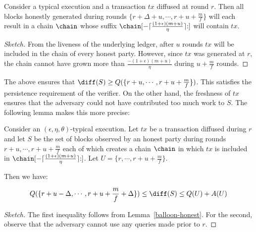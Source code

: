 \begin{lemma}\label{lem:balloon-honest}
Consider a typical execution and a transaction $tx$ diffused at round $r$. Then
all blocks honestly generated during rounds $\{r + \Delta + u, \cdots, r + u + \frac{m}{f}\}$
will each result in a chain $\chain$ whose suffix $\chain[-\lceil\frac{(1 +
\epsilon)(m + u)}{\eta}\rceil{:}]$ will contain $tx$.
\end{lemma}
\begin{proof}[Sketch]
  From the liveness of the underlying ledger, after $u$ rounds $tx$ will be
  included in the chain of every honest party. However, since $tx$ was generated
  at $r$, the chain cannot have grown more than
  $\frac{-(1 + \epsilon)(m + u)}{\eta}$ during $u + \frac{m}{f}$ rounds.
\end{proof}

The above ensures that
$\diff(S) \geq Q(\{r + u, \cdots, r + u + \frac{m}{f}\})$. This satisfies the
persistence requirement of the verifier. On the other hand, the freshness of
$tx$ ensures that the adversary could not have contributed too much work to
$S$. The following lemma makes this more precise:

\begin{lemma}\label{lem:balloon-bounds}
  Consider an $(\epsilon, \eta, \theta)$-typical execution. Let $tx$ be a transaction diffused during $r$
  and let $S$ be the set of blocks observed by an honest
  party during rounds $r + u, \cdots, r + u + \frac{m}{f}$ each of which creates a chain
  $\chain$ in which $tx$ is included in $\chain[-\lceil\frac{(1 + \epsilon)(m +
  u)}{\eta}\rceil{:}]$. Let $U = \{r, \cdots, r + u + \frac{m}{f}\}$.

  Then we have:

  \[
  Q(\{r + u - \Delta, \cdots, r + u + \frac{m}{f} + \Delta\})
  \leq \diff(S) \leq
  Q(U) + A(U)
  \]
\end{lemma}
\begin{proof}[Sketch]
  The first inequality follows from Lemma~\ref{balloon-honest}. For the second,
  observe that the adversary cannot use any queries made prior to $r$.
\end{proof}

